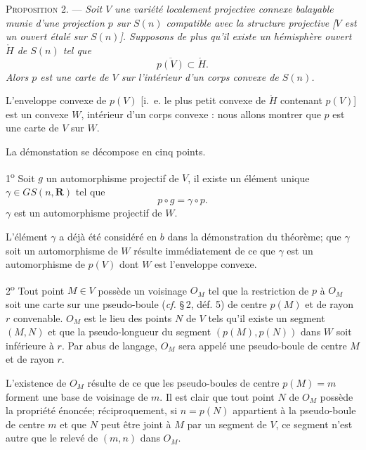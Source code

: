 \documentclass[11pt]{article}
\newcommand{\R}{\boldsymbol{R}}
\newcommand{\bzcf}[2]{#1}
\newenvironment{prop}[1][]{\par\medskip\noindent\textsc{Proposition #1.} --- \itshape}{\par\medskip}
\newenvironment{proof}[1][]{\par}{\par}
\begin{document}
\begin{prop}[2]
Soit $V$ une variété localement projective connexe balayable munie d'une projection $p$ sur
$S(n)$ compatible avec la structure projective [$V$ est un ouvert étalé sur $S(n)$]. Supposons de
plus qu'il existe un hémisphère ouvert $\mathring{H}$ de $S(n)$ tel que
\[ \overline{p(V)}\subset\mathring{H}. \]
Alors $p$ est une carte de $V$ sur l'intérieur d'un corps convexe de $S(n)$.
\end{prop}

\begin{proof}
L'enveloppe convexe de $p(V)$ [i.~e. le plus petit convexe de $\mathring{H}$ contenant $p(V)$] est
un convexe $W$, intérieur d'un corps convexe : nous allons montrer que $p$ est une carte de $V$
sur $W$.

La démonstation se décompose en cinq points.

1\textsuperscript{o} Soit $g$ un automorphisme projectif de $V$, il existe un élément unique
$\gamma\in GS(n, \R)$ tel que
\[ p\circ g=\gamma\circ p. \]
$\gamma$ est un automorphisme projectif de $W$.

L'élément $\gamma$ a déjà été considéré \bzcf{en $b$ dans la démonstration du
théorème}{\ref{bzthm:c2s3t1_poche_balayable}}; que $\gamma$ soit un automorphisme de $W$ résulte
immédiatement de ce que $\gamma$ est un automorphisme de $p(V)$ dont $W$ est l'enveloppe convexe.

2\textsuperscript{o} Tout point $M\in V$ possède un voisinage $O_M$ tel que la restriction de $p$
à $O_M$ soit une carte sur une pseudo-boule (\bzcf{\textit{cf.} \S\,2, déf.
5}{\ref{bzdef:c2s2d5_nombre_recouvrement}}) de centre $p(M)$ et de rayon $r$ convenable. $O_M$ est
le lieu des points $N$ de $V$ tels qu'il existe un segment $(M, N)$ et que la pseudo-longueur du
segment $(p(M), p(N))$ dans $W$ soit inférieure à $r$. Par abus de langage, $O_M$ sera appelé une
pseudo-boule de centre $M$ et de rayon $r$.

L'existence de $O_M$ résulte de ce que les pseudo-boules de centre $p(M)=m$ forment une base de
voisinage de $m$. Il est clair que tout point $N$ de $O_M$ possède la propriété énoncée;
réciproquement, si $n=p(N)$ appartient à la pseudo-boule de centre $m$ et que $N$ peut être joint
à $M$ par un segment de $V$, ce segment n'est autre que le relevé de $(m, n)$ dans $O_M$.


\end{proof}
\end{document}
